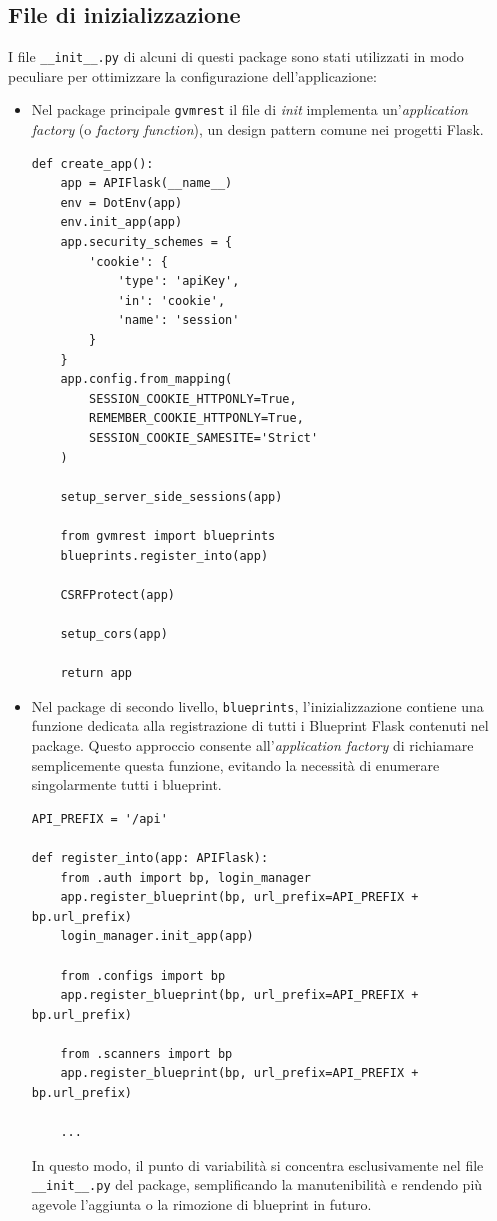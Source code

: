 \subsection{File di inizializzazione}
I file \texttt{\_\_init\_\_.py} di alcuni di questi package sono stati utilizzati in modo peculiare per ottimizzare la configurazione dell'applicazione:
\begin{itemize}
    \item Nel package principale \texttt{gvmrest} il file di \emph{init} implementa un'\emph{application factory} (o \emph{factory function}), un design pattern comune nei progetti Flask.

\begin{lstlisting}[caption={Application factory}]
def create_app():
    app = APIFlask(__name__)
    env = DotEnv(app)
    env.init_app(app)
    app.security_schemes = {
        'cookie': {
            'type': 'apiKey',
            'in': 'cookie',
            'name': 'session'
        }
    }
    app.config.from_mapping(
        SESSION_COOKIE_HTTPONLY=True,
        REMEMBER_COOKIE_HTTPONLY=True,
        SESSION_COOKIE_SAMESITE='Strict'
    )

    setup_server_side_sessions(app)

    from gvmrest import blueprints
    blueprints.register_into(app)

    CSRFProtect(app)

    setup_cors(app)

    return app
\end{lstlisting}

    \item Nel package di secondo livello, \texttt{blueprints}, l'inizializzazione contiene una funzione dedicata alla registrazione di tutti i Blueprint Flask contenuti nel package. Questo approccio consente all'\emph{application factory} di richiamare semplicemente questa funzione, evitando la necessità di enumerare singolarmente tutti i blueprint.

\begin{lstlisting}[caption={Registrazione dei blueprint}]
API_PREFIX = '/api'

def register_into(app: APIFlask):
    from .auth import bp, login_manager
    app.register_blueprint(bp, url_prefix=API_PREFIX + bp.url_prefix)
    login_manager.init_app(app)
    
    from .configs import bp
    app.register_blueprint(bp, url_prefix=API_PREFIX + bp.url_prefix)
    
    from .scanners import bp
    app.register_blueprint(bp, url_prefix=API_PREFIX + bp.url_prefix)

    ...
\end{lstlisting}
    
    In questo modo, il punto di variabilità si concentra esclusivamente nel file \texttt{\_\_init\_\_.py} del package, semplificando la manutenibilità e rendendo più agevole l'aggiunta o la rimozione di blueprint in futuro.
\end{itemize}

